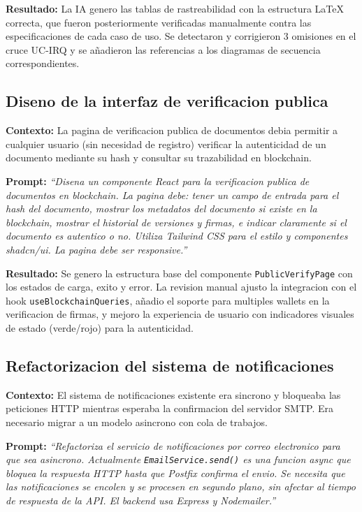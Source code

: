 \documentclass[11pt, a4paper]{article}
\begin{document}
\textbf{Resultado:} La IA genero las tablas de rastreabilidad con la estructura LaTeX correcta, que fueron posteriormente verificadas manualmente contra las especificaciones de cada caso de uso. Se detectaron y corrigieron 3 omisiones en el cruce UC-IRQ y se añadieron las referencias a los diagramas de secuencia correspondientes.

\subsection{Diseno de la interfaz de verificacion publica}

\textbf{Contexto:} La pagina de verificacion publica de documentos debia permitir a cualquier usuario (sin necesidad de registro) verificar la autenticidad de un documento mediante su hash y consultar su trazabilidad en blockchain.

\textbf{Prompt:} \textit{``Disena un componente React para la verificacion publica de documentos en blockchain. La pagina debe: tener un campo de entrada para el hash del documento, mostrar los metadatos del documento si existe en la blockchain, mostrar el historial de versiones y firmas, e indicar claramente si el documento es autentico o no. Utiliza Tailwind CSS para el estilo y componentes shadcn/ui. La pagina debe ser responsive.''}

\textbf{Resultado:} Se genero la estructura base del componente \texttt{PublicVerifyPage} con los estados de carga, exito y error. La revision manual ajusto la integracion con el hook \texttt{useBlockchainQueries}, añadio el soporte para multiples wallets en la verificacion de firmas, y mejoro la experiencia de usuario con indicadores visuales de estado (verde/rojo) para la autenticidad.

\subsection{Refactorizacion del sistema de notificaciones}

\textbf{Contexto:} El sistema de notificaciones existente era sincrono y bloqueaba las peticiones HTTP mientras esperaba la confirmacion del servidor SMTP. Era necesario migrar a un modelo asincrono con cola de trabajos.

\textbf{Prompt:} \textit{``Refactoriza el servicio de notificaciones por correo electronico para que sea asincrono. Actualmente \texttt{EmailService.send()} es una funcion async que bloquea la respuesta HTTP hasta que Postfix confirma el envio. Se necesita que las notificaciones se encolen y se procesen en segundo plano, sin afectar al tiempo de respuesta de la API. El backend usa Express y Nodemailer.''}
\end{document}
